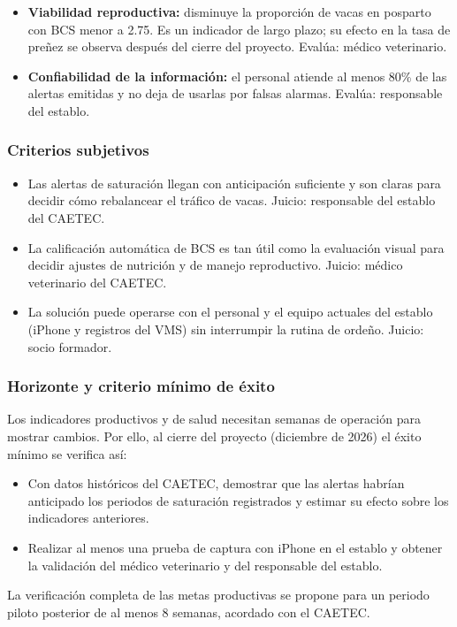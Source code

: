 \begin{itemize}
  \item \textbf{Viabilidad reproductiva:} disminuye la proporción de vacas en posparto con BCS menor a 2.75. Es un indicador de largo plazo; su efecto en la tasa de preñez se observa después del cierre del proyecto. Evalúa: médico veterinario.
  \item \textbf{Confiabilidad de la información:} el personal atiende al menos 80\% de las alertas emitidas y no deja de usarlas por falsas alarmas. Evalúa: responsable del establo.
\end{itemize}

\subsubsection{Criterios subjetivos}

\begin{itemize}
  \item Las alertas de saturación llegan con anticipación suficiente y son claras para decidir cómo rebalancear el tráfico de vacas. Juicio: responsable del establo del CAETEC.
  \item La calificación automática de BCS es tan útil como la evaluación visual para decidir ajustes de nutrición y de manejo reproductivo. Juicio: médico veterinario del CAETEC.
  \item La solución puede operarse con el personal y el equipo actuales del establo (iPhone y registros del VMS) sin interrumpir la rutina de ordeño. Juicio: socio formador.
\end{itemize}

\subsubsection{Horizonte y criterio mínimo de éxito}

Los indicadores productivos y de salud necesitan semanas de operación para mostrar cambios. Por ello, al cierre del proyecto (diciembre de 2026) el éxito mínimo se verifica así:

\begin{itemize}
  \item Con datos históricos del CAETEC, demostrar que las alertas habrían anticipado los periodos de saturación registrados y estimar su efecto sobre los indicadores anteriores.
  \item Realizar al menos una prueba de captura con iPhone en el establo y obtener la validación del médico veterinario y del responsable del establo.
\end{itemize}

La verificación completa de las metas productivas se propone para un periodo piloto posterior de al menos 8 semanas, acordado con el CAETEC.
